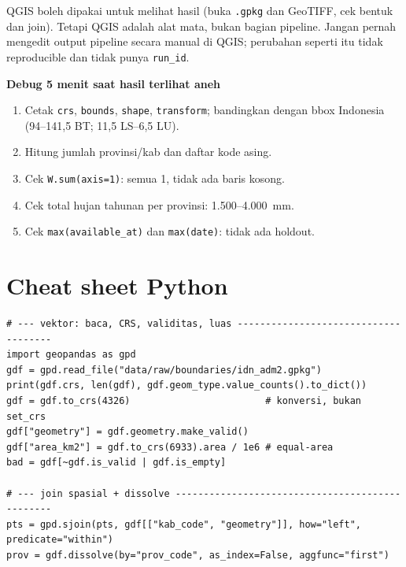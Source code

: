 \documentclass[9pt,a4paper]{extarticle}
\newcommand{\code}[1]{\texttt{\small\color{ink}#1}}
\newenvironment{projectbox}[1]
  {\begin{tcolorbox}[enhanced,breakable,colback=bg,colframe=bg,boxrule=0pt,arc=1.1mm,
    left=3mm,right=2.2mm,top=1.4mm,bottom=1.4mm,borderline west={2.2pt}{0pt}{ink},
    before skip=3pt,after skip=3pt]
   \textcolor{ink}{\sffamily\bfseries #1}\par\vspace{0.5pt}}
  {\end{tcolorbox}}
\begin{document}
QGIS boleh dipakai untuk melihat hasil (buka \code{.gpkg} dan GeoTIFF, cek bentuk dan join). Tetapi QGIS adalah alat mata, bukan bagian pipeline. Jangan pernah mengedit output pipeline secara manual di QGIS; perubahan seperti itu tidak reproducible dan tidak punya \code{run\_id}.

\begin{projectbox}{Debug 5 menit saat hasil terlihat aneh}
\begin{enumerate}[leftmargin=1.2em,itemsep=0.1pt,topsep=0.5pt,font=\footnotesize]
  \item Cetak \code{crs}, \code{bounds}, \code{shape}, \code{transform}; bandingkan dengan bbox Indonesia (94--141,5 BT; 11,5 LS--6,5 LU).
  \item Hitung jumlah provinsi/kab dan daftar kode asing.
  \item Cek \code{W.sum(axis=1)}: semua 1, tidak ada baris kosong.
  \item Cek total hujan tahunan per provinsi: 1.500--4.000~mm.
  \item Cek \code{max(available\_at)} dan \code{max(date)}: tidak ada holdout.
\end{enumerate}
\end{projectbox}

\newpage
\section{Cheat sheet Python}

\begin{lstlisting}
# --- vektor: baca, CRS, validitas, luas -------------------------------------
import geopandas as gpd
gdf = gpd.read_file("data/raw/boundaries/idn_adm2.gpkg")
print(gdf.crs, len(gdf), gdf.geom_type.value_counts().to_dict())
gdf = gdf.to_crs(4326)                        # konversi, bukan set_crs
gdf["geometry"] = gdf.geometry.make_valid()
gdf["area_km2"] = gdf.to_crs(6933).area / 1e6 # equal-area
bad = gdf[~gdf.is_valid | gdf.is_empty]

# --- join spasial + dissolve ------------------------------------------------
pts = gpd.sjoin(pts, gdf[["kab_code", "geometry"]], how="left", predicate="within")
prov = gdf.dissolve(by="prov_code", as_index=False, aggfunc="first")
\end{lstlisting}
\end{document}
